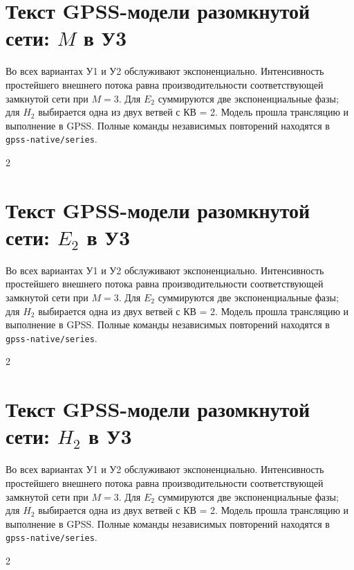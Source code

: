 \documentclass[12pt,a4paper]{article}
\begin{document}
\newpage\section{Текст GPSS-модели разомкнутой сети: \(M\) в У3}
Во всех вариантах У1 и У2 обслуживают экспоненциально. 
Интенсивность простейшего внешнего потока равна производительности соответствующей замкнутой сети при \(M=3\). 
Для \(E_2\) суммируются две экспоненциальные фазы; для \(H_2\) выбирается одна из двух ветвей с КВ = 2. Модель прошла трансляцию и выполнение в GPSS. Полные команды независимых повторений находятся в \texttt{gpss-native/series}.\par
\begin{multicols}{2}\end{multicols}
\newpage\section{Текст GPSS-модели разомкнутой сети: \(E_2\) в У3}
Во всех вариантах У1 и У2 обслуживают экспоненциально. 
Интенсивность простейшего внешнего потока равна производительности соответствующей замкнутой сети при \(M=3\). 
Для \(E_2\) суммируются две экспоненциальные фазы; для \(H_2\) выбирается одна из двух ветвей с КВ = 2. Модель прошла трансляцию и выполнение в GPSS. Полные команды независимых повторений находятся в \texttt{gpss-native/series}.\par
\begin{multicols}{2}\end{multicols}
\newpage\section{Текст GPSS-модели разомкнутой сети: \(H_2\) в У3}
Во всех вариантах У1 и У2 обслуживают экспоненциально. 
Интенсивность простейшего внешнего потока равна производительности соответствующей замкнутой сети при \(M=3\). 
Для \(E_2\) суммируются две экспоненциальные фазы; для \(H_2\) выбирается одна из двух ветвей с КВ = 2. Модель прошла трансляцию и выполнение в GPSS. Полные команды независимых повторений находятся в \texttt{gpss-native/series}.\par
\begin{multicols}{2}\end{multicols}
\end{document}
